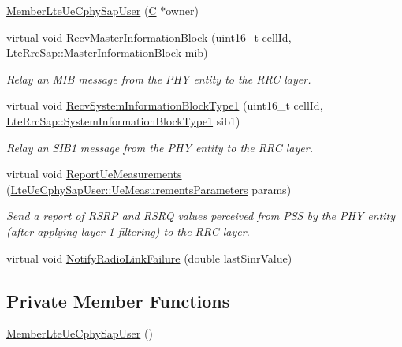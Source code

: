 \begin{DoxyCompactItemize}
\item 
\hyperlink{classns3_1_1MemberLteUeCphySapUser_a4125582701481d062c0810061ded771b}{Member\+Lte\+Ue\+Cphy\+Sap\+User} (\hyperlink{loss__COST231__small__cities__urban_8m_aaa53ca0b650dfd85c4f59fa156f7a2cc}{C} $\ast$owner)
\item 
virtual void \hyperlink{classns3_1_1MemberLteUeCphySapUser_a4231ee180c40ef9e3da0e4d45621e9c2}{Recv\+Master\+Information\+Block} (uint16\+\_\+t cell\+Id, \hyperlink{structns3_1_1LteRrcSap_1_1MasterInformationBlock}{Lte\+Rrc\+Sap\+::\+Master\+Information\+Block} mib)
\begin{DoxyCompactList}\small\item\em Relay an M\+IB message from the P\+HY entity to the R\+RC layer. \end{DoxyCompactList}\item 
virtual void \hyperlink{classns3_1_1MemberLteUeCphySapUser_a955d66660ef39c18e44d0d53dda82435}{Recv\+System\+Information\+Block\+Type1} (uint16\+\_\+t cell\+Id, \hyperlink{structns3_1_1LteRrcSap_1_1SystemInformationBlockType1}{Lte\+Rrc\+Sap\+::\+System\+Information\+Block\+Type1} sib1)
\begin{DoxyCompactList}\small\item\em Relay an S\+I\+B1 message from the P\+HY entity to the R\+RC layer. \end{DoxyCompactList}\item 
virtual void \hyperlink{classns3_1_1MemberLteUeCphySapUser_ab9a2ac93ed4e88724b8044ceefbeede7}{Report\+Ue\+Measurements} (\hyperlink{structns3_1_1LteUeCphySapUser_1_1UeMeasurementsParameters}{Lte\+Ue\+Cphy\+Sap\+User\+::\+Ue\+Measurements\+Parameters} params)
\begin{DoxyCompactList}\small\item\em Send a report of R\+S\+RP and R\+S\+RQ values perceived from P\+SS by the P\+HY entity (after applying layer-\/1 filtering) to the R\+RC layer. \end{DoxyCompactList}\item 
virtual void \hyperlink{classns3_1_1MemberLteUeCphySapUser_a26b9e95748fdd9e4fc63f4aa04ad8d24}{Notify\+Radio\+Link\+Failure} (double last\+Sinr\+Value)
\end{DoxyCompactItemize}
\subsection*{Private Member Functions}
\begin{DoxyCompactItemize}
\item 
\hyperlink{classns3_1_1MemberLteUeCphySapUser_ad021b15e98c3cdd9e3ee8f7c10de8b9a}{Member\+Lte\+Ue\+Cphy\+Sap\+User} ()
\end{DoxyCompactItemize}
